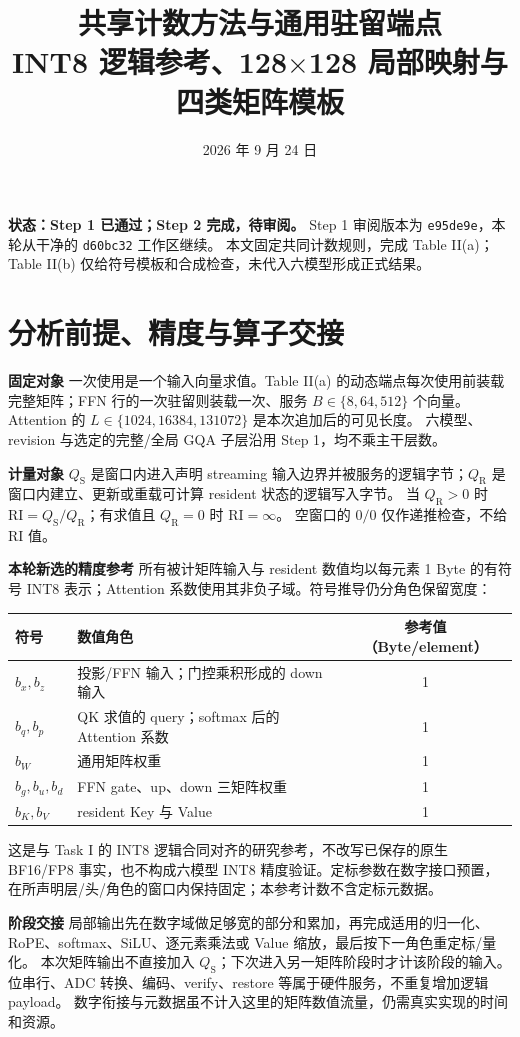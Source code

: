 \documentclass[11pt,a4paper,fontset=fandol]{ctexart}
\title{\bfseries 共享计数方法与通用驻留端点\\[5pt]\large INT8 逻辑参考、128$\times$128 局部映射与四类矩阵模板}
\author{}\date{2026 年 9 月 24 日}
\newcommand{\RI}{\mathrm{RI}}
\newcommand{\qs}{Q_{\mathrm S}}
\newcommand{\qr}{Q_{\mathrm R}}
\newcommand{\para}[1]{\par\smallskip\noindent\textbf{#1}\quad}
\begin{document}
\maketitle\vspace{-1.4em}
\noindent\textbf{状态：Step 1 已通过；Step 2 完成，待审阅。}
Step 1 审阅版本为 \texttt{e95de9e}，本轮从干净的 \texttt{d60bc32} 工作区继续。
本文固定共同计数规则，完成 Table II(a)；Table II(b) 仅给符号模板和合成检查，未代入六模型形成正式结果。

\section{分析前提、精度与算子交接}
\para{固定对象}
一次使用是一个输入向量求值。Table II(a) 的动态端点每次使用前装载完整矩阵；FFN 行的一次驻留则装载一次、服务 $B\in\{8,64,512\}$ 个向量。
Attention 的 $L\in\{1024,16384,131072\}$ 是本次追加后的可见长度。
六模型、revision 与选定的完整/全局 GQA 子层沿用 Step 1，均不乘主干层数。

\para{计量对象}
$\qs$ 是窗口内进入声明 streaming 输入边界并被服务的逻辑字节；$\qr$ 是窗口内建立、更新或重载可计算 resident 状态的逻辑写入字节\cite{conventions}。
当 $\qr>0$ 时 $\RI=\qs/\qr$；有求值且 $\qr=0$ 时 $\RI=\infty$。
空窗口的 $0/0$ 仅作递推检查，不给 RI 值。

\para{本轮新选的精度参考}
所有被计矩阵输入与 resident 数值均以每元素 1 Byte 的有符号 INT8 表示；Attention 系数使用其非负子域。符号推导仍分角色保留宽度：
\begin{center}\small
\begin{tabularx}{\textwidth}{@{}lXc@{}}\toprule
符号 & 数值角色 & 参考值（Byte/element）\\\midrule
$b_x,b_z$ & 投影/FFN 输入；门控乘积形成的 down 输入 & 1\\
$b_q,b_p$ & QK 求值的 query；softmax 后的 Attention 系数 & 1\\
$b_W$ & 通用矩阵权重 & 1\\
$b_g,b_u,b_d$ & FFN gate、up、down 三矩阵权重 & 1\\
$b_K,b_V$ & resident Key 与 Value & 1\\\bottomrule
\end{tabularx}\end{center}
这是与 Task I 的 INT8 逻辑合同对齐的研究参考，不改写已保存的原生 BF16/FP8 事实，也不构成六模型 INT8 精度验证。定标参数在数字接口预置，在所声明层/头/角色的窗口内保持固定；本参考计数不含定标元数据。

\para{阶段交接}
局部输出先在数字域做足够宽的部分和累加，再完成适用的归一化、RoPE、softmax、SiLU、逐元素乘法或 Value 缩放，最后按下一角色重定标/量化。
本次矩阵输出不直接加入 $\qs$；下次进入另一矩阵阶段时才计该阶段的输入。
位串行、ADC 转换、编码、verify、restore 等属于硬件服务，不重复增加逻辑 payload。
数字衔接与元数据虽不计入这里的矩阵数值流量，仍需真实实现的时间和资源。
\end{document}
